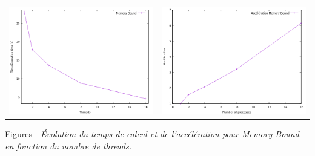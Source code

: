 	\begin{frame}
	\footnotesize\begin{longtable}{l l}		
 		\hspace{-2em} \includegraphics[scale=0.37]{Memory.png}  & \hspace{-1em}\includegraphics[scale=0.37]{Acc_Memory.png}\\
 			\end{longtable}
		 \color{blue} Figures - \color{black}\textit{Évolution du temps de calcul et de l'accélération pour Memory Bound en fonction du nombre de threads.} \\
		\end{frame}
	
